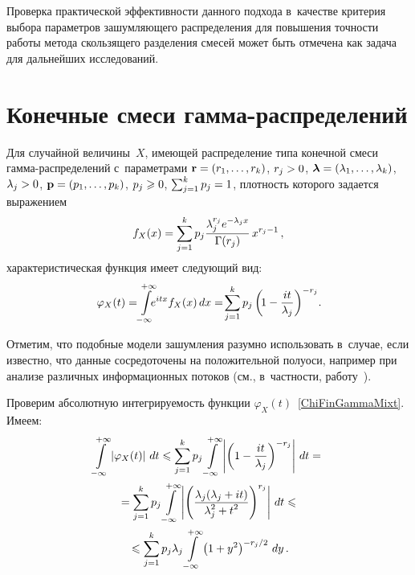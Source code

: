 \begin{multicols}{2}
Проверка практической эффективности данного подхода в~качестве 
критерия выбора параметров зашумляющего распределения для повышения 
точности работы метода скользящего разделения смесей может быть отмечена 
как задача для дальнейших исследований.


\section{Конечные смеси гамма-распределений}

Для случайной величины~$X$, имеющей распределение типа конечной смеси 
гам\-ма-рас\-пре\-де\-ле\-ний с~параметрами ${\bf r}\hm=(r_1,\ldots, r_k)$,
 $r_j\hm>0$, $\boldsymbol{\lambda}\hm=(\lambda_1,\ldots, \lambda_k)$, $\lambda_j\hm>0$, 
 ${\bf p}\hm=(p_1,\ldots, p_k)$, $p_j\hm\geqslant 0$, $\sum\nolimits_{j=1}^{k}p_j\hm=1$, 
 плот\-ность которого задается выражением
\begin{equation}
f_X(x)=\sum\limits_{j=1}^{k}p_j\displaystyle\frac{\displaystyle \lambda_j^{r_j} e^{-\lambda_j x}\mathstrut}{\displaystyle \Gamma(r_j)\mathstrut}\,x^{r_j-1}\,,
\label{FinGammaMixt}
\end{equation}
характеристическая функция имеет следующий вид:
\begin{equation}
\varphi_X(t)=\!\int\limits_{-\infty}^{+\infty}\!\!\!e^{itx} f_X(x)\, dx = \!
\sum\limits_{j=1}^{k}p_j \left(\!1-\fr{it}{\lambda_j}\right)^{-r_j}\!.\!
\label{ChiFinGammaMixt}
\end{equation}

Отметим, что подобные модели зашумления разумно использовать в~случае, 
если известно, что данные сосредоточены на положительной полуоси, например 
при анализе различных информационных потоков (см., в~част\-ности, 
 работу~\cite{Gorshenin2013}). 

Проверим абсолютную интегрируемость функции $\varphi_X(t)$~\eqref{ChiFinGammaMixt}. 
Имеем:
\begin{multline*}
\int\limits_{-\infty}^{+\infty}\left\lvert\varphi_X(t)\right\rvert\, dt\leqslant 
\sum\limits_{j=1}^{k}p_j \int\limits_{-\infty}^{+\infty}\left\lvert \left(
1-\displaystyle\frac{\displaystyle it\mathstrut}{\displaystyle \lambda_j\mathstrut}\right)^{-r_j}\right\rvert \, dt={}\\
{}=\sum\limits_{j=1}^{k}p_j \int\limits_{-\infty}^{+\infty} \left\lvert\left(
\displaystyle\frac{\displaystyle \lambda_j(\lambda_j+it)\mathstrut}{\displaystyle \lambda_j^2+t^2\mathstrut}\right)^{r_j}\right\rvert\, dt \leqslant{}\\
{}\leqslant\sum\limits_{j=1}^{k}p_j \lambda_j \int\limits_{-\infty}^{+\infty}\left(
1+y^2\right)^{-{r_j}/{2}}\, dy\,.
\end{multline*}


\end{multicols}
